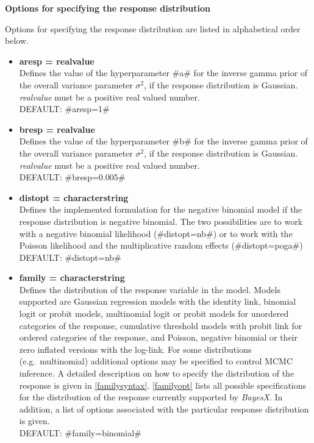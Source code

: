 \newpage

{\bf Options for specifying the response distribution}

Options for specifying the response distribution are listed in
alphabetical order below.


\begin{itemize}
\item {\bf aresp = realvalue } \\
Defines the value of the hyperparameter #a# for the inverse gamma
prior of the overall variance parameter $\sigma^2$, if the
response distribution is Gaussian.
{\em realvalue} must be a positive real valued number. \\
DEFAULT: #aresp=1#

\item {\bf bresp = realvalue } \\
Defines the value of the hyperparameter #b# for the inverse gamma
prior of the overall variance parameter $\sigma^2$, if the
response distribution is Gaussian.
{\em realvalue} must be a positive real valued number. \\
DEFAULT: #bresp=0.005#

\item {\bf distopt =  characterstring} \\
Defines the implemented formulation for the negative binomial
model if the response distribution is negative binomial. The two
possibilities are to work with a negative binomial likelihood
(#distopt=nb#) or to work with the
Poisson likelihood and the multiplicative random effects (#distopt=poga#)\\
DEFAULT: #distopt=nb#


\item {\bf family = characterstring } \\
Defines the distribution of the response variable in the model.
Models supported are Gaussian regression models with the identity
link, binomial logit or probit models, multinomial logit or probit
models for unordered categories of the response, cumulative
threshold models with probit link for ordered categories of the
response, and Poisson, negative binomial or their zero inflated
versions with the
log-link. For some distributions (e.g.~multinomial) additional
options may be specified to control MCMC inference. A detailed
description on how to specify the distribution of the response is
given in \autoref{familysyntax}. \autoref{familyopt} lists all
possible specifications for the distribution of the response
currently supported by {\em BayesX}. In addition, a list of
options associated
with the particular response distribution is given. \\
DEFAULT: #family=binomial#


\end{itemize}
